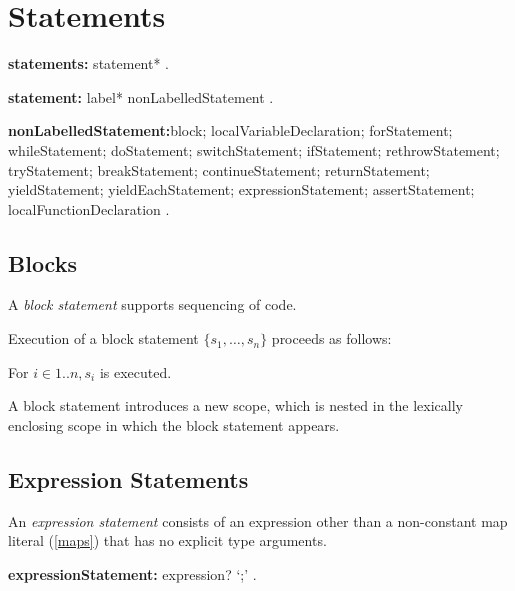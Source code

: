 \documentclass{article}
\begin{document}
\section{Statements}

 \begin{grammar}
{\bf statements:}
      statement*
    .


{\bf statement:}
      label* nonLabelledStatement
    .

{\bf nonLabelledStatement:}block;
      localVariableDeclaration;
      forStatement;
      whileStatement;
      doStatement;
      switchStatement;
      ifStatement;
      rethrowStatement;
      tryStatement;
      breakStatement;
      continueStatement;
      returnStatement;
      yieldStatement;
      yieldEachStatement;
      expressionStatement;
      assertStatement;
      localFunctionDeclaration
    .
 \end{grammar}

 \subsection{Blocks}

\LMHash{}
 A {\em block statement} supports sequencing of code.

\LMHash{}
Execution of a block statement $\{s_1, \ldots,  s_n\}$ proceeds as follows:

\LMHash{}
For $i \in 1 .. n, s_i$ is executed.

\LMHash{}
A block statement introduces a new scope, which is nested in the lexically enclosing scope in which the block statement appears.



 \subsection{Expression Statements}

\LMHash{}
An {\em expression statement} consists of an expression other than a non-constant map literal (\ref{maps}) that has no explicit type arguments.


 \begin{grammar}
{\bf expressionStatement:}
  expression? `{\escapegrammar ;}'
  .
 \end{grammar}
\end{document}
